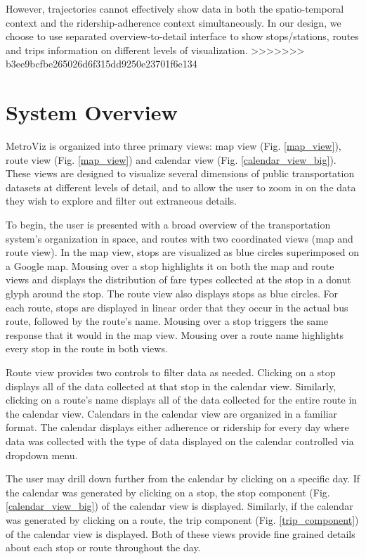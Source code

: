 \documentclass[journal]{vgtc}                %
\begin{document}
However, trajectories cannot effectively show data in both the spatio-temporal context and the ridership-adherence context simultaneously. In our design, we choose to use separated overview-to-detail interface to show stops/stations, routes and trips information on different levels of visualization.
>>>>>>> b3ee9bcfbe265026d6f315dd9250e23701f6e134

\section{System Overview}
MetroViz is organized into three primary views: map view (Fig. \ref{map_view}), route view (Fig. \ref{map_view}) and calendar view (Fig. \ref{calendar_view_big}). These views are designed to visualize several dimensions of public transportation datasets at different levels of detail, and to allow the user to zoom in on the data they wish to explore and filter out extraneous details.

To begin, the user is presented with a broad overview of the transportation system's organization in space, and routes with two coordinated views (map and route view). In the map view, stops are visualized as blue circles superimposed on a Google map. Mousing over a stop highlights it on both the map and route views and displays the distribution of fare types collected at the stop in a donut glyph around the stop. The route view also displays stops as blue circles. For each route, stops are displayed in linear order that they occur in the actual bus route, followed by the route's name. Mousing over a stop triggers the same response that it would in the map view. Mousing over a route name highlights every stop in the route in both views.

Route view provides two controls to filter data as needed. Clicking on a stop displays all of the data collected at that stop in the calendar view. Similarly, clicking on a route's name displays all of the data collected for the entire route in the calendar view. Calendars in the calendar view are organized in a familiar format. The calendar displays either adherence or ridership for every day where data was collected with the type of data displayed on the calendar controlled via dropdown menu.

The user may drill down further from the calendar by clicking on a specific day. If the calendar was generated by clicking on a stop, the stop component (Fig. \ref{calendar_view_big}) of the calendar view is displayed. Similarly, if the calendar was generated by clicking on a route, the trip component (Fig. \ref{trip_component}) of the calendar view is displayed. Both of these views provide fine grained details about each stop or route throughout the day.
\end{document}
